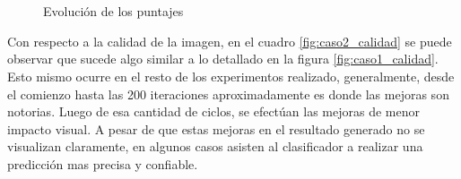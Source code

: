 \documentclass[a4paper,11pt,spanish]{book}
\begin{document}
      \begin{figure}[H]
	\begin{center}
	  \\
	  \\
	\end{center}
	\caption{Evolución de los puntajes}
	\label{fig:puntajes_caso2}
      \end{figure}
      
      Con respecto a la calidad de la imagen, en el cuadro \ref{fig:caso2_calidad} se puede observar que sucede algo similar a lo detallado en la figura \ref{fig:caso1_calidad}.
      Esto mismo ocurre en el resto de los experimentos realizado, generalmente, desde el comienzo hasta las 200 iteraciones aproximadamente es donde las mejoras son notorias. 
      Luego de esa cantidad de ciclos, se efectúan las mejoras de menor impacto visual. A pesar de que estas mejoras en el resultado generado no se visualizan claramente,
      en algunos casos asisten al clasificador a realizar una predicción mas precisa y confiable.
      
\end{document}
